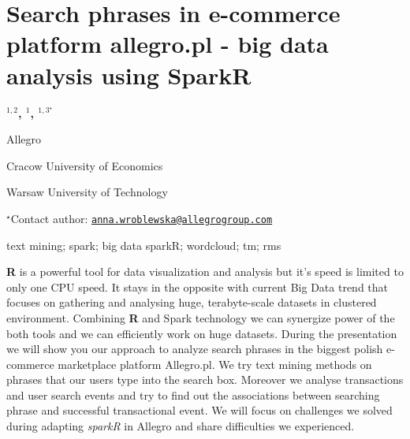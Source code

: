 \documentclass[\main/boa.tex]{subfiles}
\begin{document}
\section{Search phrases in e-commerce platform allegro.pl - big data analysis
using SparkR}

\begin{center}
  {\bf {}$^{1, 2}$, $^{1}$, $^{1, 3^\star}$}
\end{center}

\vskip 0.3cm

\begin{affiliations}
\begin{enumerate}
\begin{minipage}{0.915\textwidth}
\centering
\item Allegro \\[-2pt]
\item Cracow University of Economics \\[-2pt]
\item Warsaw University of Technology \\[-2pt]
\end{minipage}
\end{enumerate}
$^\star$Contact author: \href{mailto:anna.wroblewska@allegrogroup.com}{\nolinkurl{anna.wroblewska@allegrogroup.com}}\\
\end{affiliations}

\vskip 0.5cm

\begin{minipage}{0.915\textwidth}
\keywords text mining; spark; big data
\packages sparkR; wordcloud; tm; rms
\end{minipage}

\vskip 0.8cm

\textbf{R} is a powerful tool for data visualization and analysis but
it's speed is limited to only one CPU speed. It stays in the opposite
with current Big Data trend that focuses on gathering and analysing
huge, terabyte-scale datasets in clustered environment. Combining
\textbf{R} and Spark technology we can synergize power of the both tools
and we can efficiently work on huge datasets. During the presentation we
will show you our approach to analyze search phrases in the biggest
polish e-commerce marketplace platform Allegro.pl. We try text mining
methods on phrases that our users type into the search box. Moreover we
analyse transactions and user search events and try to find out the
associations between searching phrase and successful transactional
event. We will focus on challenges we solved during adapting
\emph{sparkR} in Allegro and share difficulties we experienced.
\end{document}
